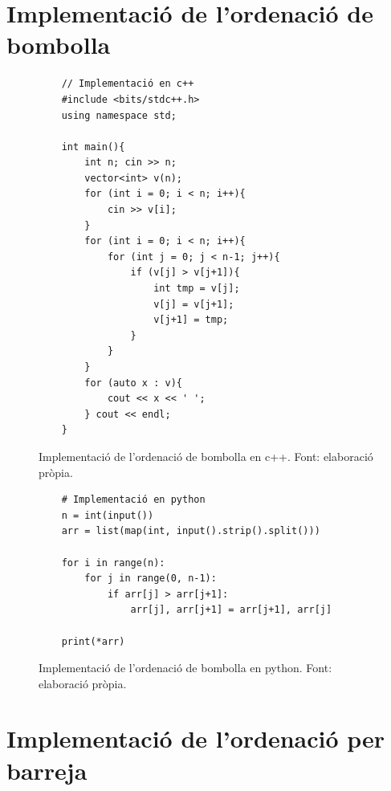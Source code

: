 \section{Implementació de l'ordenació de bombolla}
\begin{figure}[H]
    \begin{verbatim}
    // Implementació en c++
    #include <bits/stdc++.h>
    using namespace std;
    
    int main(){
        int n; cin >> n;
        vector<int> v(n);
        for (int i = 0; i < n; i++){
            cin >> v[i];
        }
        for (int i = 0; i < n; i++){
            for (int j = 0; j < n-1; j++){
                if (v[j] > v[j+1]){
                    int tmp = v[j];
                    v[j] = v[j+1];
                    v[j+1] = tmp;
                }
            }
        }
        for (auto x : v){
            cout << x << ' ';
        } cout << endl;
    }
    \end{verbatim}
    \caption[Implementació de l'ordenació de bombolla en c++.]{Implementació de l'ordenació de bombolla en c++. Font: elaboració pròpia.}
    \label{Figura}
\end{figure}
\begin{figure}[H]
    \begin{verbatim}
    # Implementació en python
    n = int(input())
    arr = list(map(int, input().strip().split()))
    
    for i in range(n):
        for j in range(0, n-1):
            if arr[j] > arr[j+1]:
                arr[j], arr[j+1] = arr[j+1], arr[j]
    
    print(*arr)
    \end{verbatim}
    \caption[Implementació de l'ordenació de bombolla en python.]{Implementació de l'ordenació de bombolla en python. Font: elaboració pròpia.}
    \label{Figura}
\end{figure}

\section{Implementació de l'ordenació per barreja}

